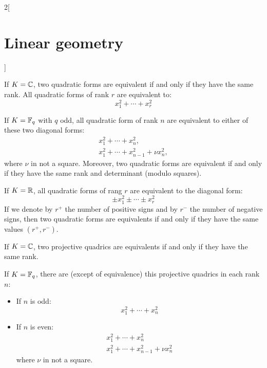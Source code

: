 \documentclass[../../../main.tex]{subfiles}
\begin{document}
\begin{multicols}{2}[\section{Linear geometry}]
\begin{proposition}
  \end{proposition}
  \begin{theorem}
    If $K=\mathbb{C} $, two quadratic forms are equivalent if and only if they have the same rank. All quadratic forms of rank $r$ are equivalent to: $$x_1^2+\cdots+x_r^2$$
  \end{theorem}
  \begin{theorem}
    If $K=\mathbb{F}_q$ with $q$ odd, all quadratic form
    of rank $n$ are equivalent to either of these two diagonal forms:
    \begin{gather*}
      x_1^2+\cdots+ x_n^2,\\
      x_1^2+\cdots+ x_{n-1}^2+\nu x_n^2,
    \end{gather*}
    where $\nu$ in not a square. Moreover, two quadratic forms are equivalent if and only if they have the same rank and determinant (modulo squares).
  \end{theorem}
  \begin{theorem}
    If $K=\mathbb{R} $, all quadratic forms
    of rang $r$ are equivalent to the diagonal form:
    $$\pm x_1^2\pm\cdots\pm x_r^2$$ If we denote by $r^+$ the number of positive signs and by $r^-$ the number of negative signs, then two quadratic forms are equivalents if and only if they have the same values $(r^+,r^-)$.
  \end{theorem}
  \begin{theorem}
    If $K=\mathbb{C} $, two projective quadrics are equivalents if and only if they have the same rank.
  \end{theorem}
  \begin{theorem}
    If $K=\mathbb{F}_q$, there are (except of equivalence) this projective quadrics in each rank $n$:
    \begin{itemize}
      \item If $n$ is odd: $$\displaystyle x_1^2+\cdots+ x_n^2$$
      \item If $n$ is even: \begin{gather*}
              x_1^2+\cdots+ x_n^2\\
              x_1^2+\cdots+ x_{n-1}^2+\nu x_n^2
            \end{gather*}
            where $\nu$ in not a square.
    \end{itemize}
  \end{theorem}

\end{multicols}
\end{document}
